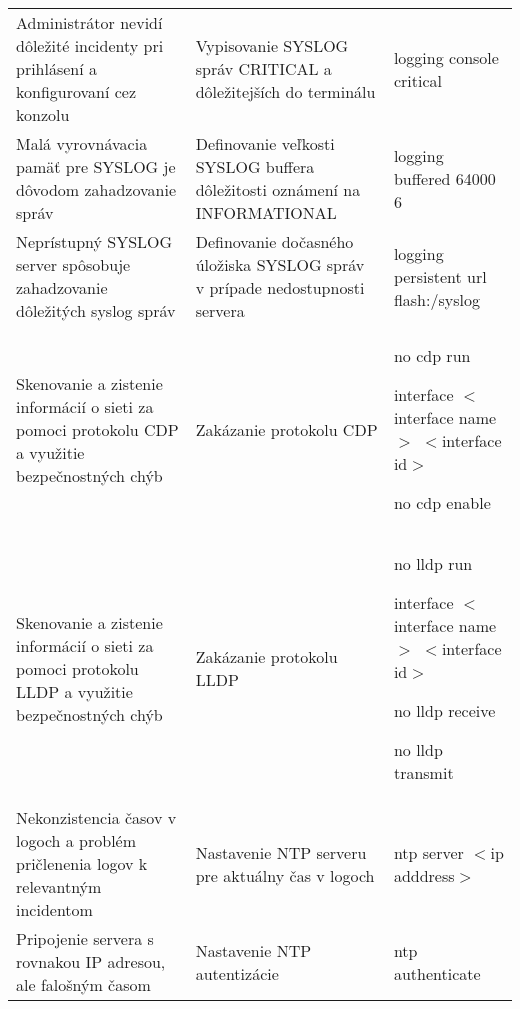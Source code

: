 \begin{longtable}[!htbp]{|L{10em}L{10em}>{\selectfont}L{34em}|}
	
	
	
	 Administrátor nevidí dôležité incidenty pri prihlásení a konfigurovaní cez konzolu	&Vypisovanie SYSLOG správ CRITICAL a dôležitejších do terminálu	&logging console critical\\
	
	
	
	
	Malá vyrovnávacia pamäť pre SYSLOG je dôvodom zahadzovanie správ	&Definovanie veľkosti SYSLOG buffera dôležitosti oznámení na INFORMATIONAL	&logging buffered 64000 6\\
	
	
	
	
	 Neprístupný SYSLOG server spôsobuje zahadzovanie dôležitých syslog správ	&Definovanie dočasného úložiska SYSLOG správ v prípade nedostupnosti servera	&logging persistent url flash:/syslog\\
	
	
	
	
	Skenovanie a zistenie informácií o sieti za pomoci protokolu CDP a využitie bezpečnostných chýb	&Zakázanie protokolu CDP	&no cdp run
	
	
	interface $<$interface name$>$ $<$interface id$>$ 
	
	\hspace{0.5em}no cdp enable\\
	
	
	
	
	 Skenovanie a zistenie informácií o sieti za pomoci protokolu LLDP a využitie bezpečnostných chýb	&Zakázanie protokolu LLDP	&no lldp run
	
	interface $<$interface name$>$ $<$interface id$>$	
	
	\hspace{0.5em}no lldp receive 
	
	\hspace{0.5em}no lldp transmit\\
	
	
	
	
	Nekonzistencia časov v logoch a problém pričlenenia logov k relevantným incidentom	&Nastavenie NTP serveru pre aktuálny čas v logoch	&ntp server $<$ip adddress$>$\\
	
	
	
	
	 Pripojenie servera s rovnakou IP adresou, ale falošným časom	&Nastavenie NTP autentizácie	&ntp authenticate
	

\end{longtable}
